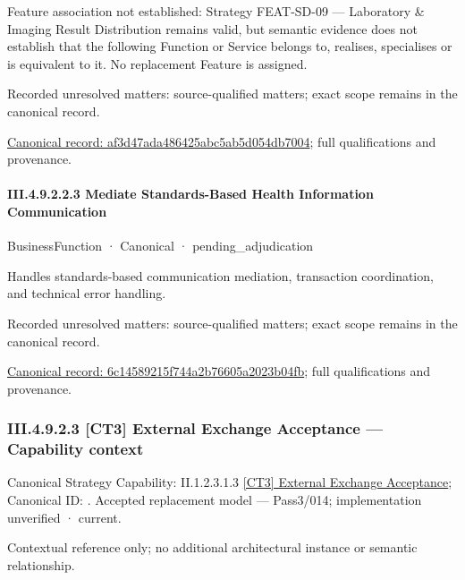 Feature association not established: Strategy FEAT-SD-09 — Laboratory \& Imaging Result Distribution remains valid, but semantic evidence does not establish that the following Function or Service belongs to, realises, specialises or is equivalent to it. No replacement Feature is assigned.


{\small Recorded unresolved matters: source-qualified matters; exact scope remains in the canonical record.}\par
{\footnotesize \href{../../../../../../../../continuum/business/business-function/af3d47ada486425abc5ab5d054db7004.md}{Canonical record: af3d47ada486425abc5ab5d054db7004}; full qualifications and provenance.}\par
\paragraph*{III.4.9.2.2.3 Mediate Standards-Based Health Information Communication}
\label{navigation:III.4.9.2.2.3}

\label{element:6c14589215f744a2b76605a2023b04fb}
{\small BusinessFunction · Canonical · pending\_adjudication}\par

Handles standards-based communication mediation, transaction coordination, and technical error handling.


{\small Recorded unresolved matters: source-qualified matters; exact scope remains in the canonical record.}\par
{\footnotesize \href{../../../../../../../../continuum/business/business-function/6c14589215f744a2b76605a2023b04fb.md}{Canonical record: 6c14589215f744a2b76605a2023b04fb}; full qualifications and provenance.}\par
\subsubsection*{III.4.9.2.3 [CT3] External Exchange Acceptance — Capability context}
\label{navigation:III.4.9.2.3}

{\small Canonical Strategy Capability: II.1.2.3.1.3 \hyperref[element:ff8ab280fa034c10b846a147ab7dbfb3]{[CT3] External Exchange Acceptance}; Canonical ID: \texttt{}. Accepted replacement model — Pass3/014; implementation unverified · current.}\par
Contextual reference only; no additional architectural instance or semantic relationship.\par
